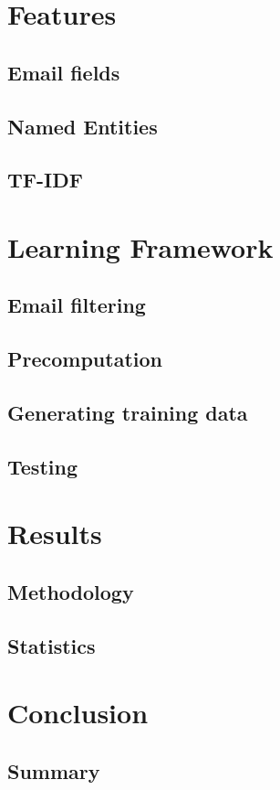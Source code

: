 \documentclass[senior,oneside]{UIUC}
\begin{document}
\chapter{Features}
\section{Email fields}
\section{Named Entities}
\section{TF-IDF}

\chapter{Learning Framework}
\section{Email filtering}
\section{Precomputation}
\section{Generating training data}
\section{Testing}

\chapter{Results}
\section{Methodology}
\section{Statistics}

\chapter{Conclusion}
\section{Summary}
\end{document}
